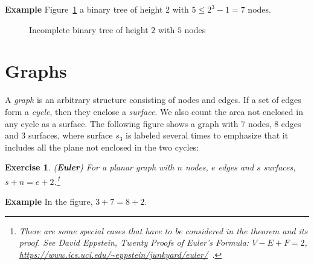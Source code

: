 \documentclass[11pt,a4paper]{report}
\newtheorem{exercise}{Exercise}
\begin{document}
\textbf{Example} Figure~\ref{fig.incomplete} a binary tree of height $2$ with $5 \leq 2^3-1=7$ nodes.

\begin{figure}[t]
\begin{center}
\caption{Incomplete binary tree of height $2$ with $5$ nodes}\label{fig.incomplete}
\end{center}
\end{figure}

\section{Graphs}

A \emph{graph} is an arbitrary structure consisting of nodes and edges. If a set of edges form a \emph{cycle}, then they enclose a \emph{surface}. We also count the area not enclosed in any cycle as a surface. %
The following figure shows a graph with $7$ nodes, $8$ edges and $3$ surfaces, where surface $s_3$ is labeled several times to emphasize that it includes all the plane not enclosed in the two cycles:

\begin{center}
\end{center}

\begin{exercise} (\textbf{Euler})
For a planar graph with $n$ nodes, $e$ edges and $s$ surfaces, $s+n=e+2$.\footnote{There are some special cases that have to be considered in the theorem and its proof. See David Eppstein, \textit{Twenty Proofs of Euler's Formula:} $V-E+F=2$, \url{https://www.ics.uci.edu/~eppstein/junkyard/euler/}\ .}
\end{exercise}
\textbf{Example} In the figure, $3+7=8+2$.
\end{document}
